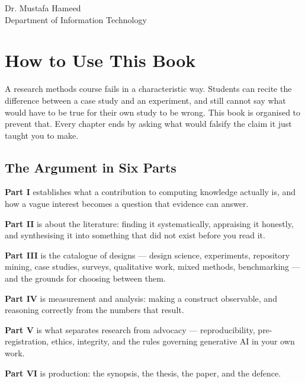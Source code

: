 \begin{center}
\vfill
{\small\color{neutral}Dr. Mustafa Hameed}\\[2pt]
{\footnotesize\color{neutral}Department of Information Technology}
\vspace{0.4cm}
\end{center}

\clearpage

\thispagestyle{plain}
\chapter*{How to Use This Book}

A research methods course fails in a characteristic way. Students can recite
the difference between a case study and an experiment, and still cannot say
what would have to be true for their own study to be wrong. This book is
organised to prevent that. Every chapter ends by asking what would falsify
the claim it just taught you to make.

\section*{The Argument in Six Parts}

\begin{tight}
  \item \textbf{Part I} establishes what a contribution to computing knowledge
    actually is, and how a vague interest becomes a question that evidence can
    answer.
  \item \textbf{Part II} is about the literature: finding it systematically,
    appraising it honestly, and synthesising it into something that did not
    exist before you read it.
  \item \textbf{Part III} is the catalogue of designs --- design science,
    experiments, repository mining, case studies, surveys, qualitative work,
    mixed methods, benchmarking --- and the grounds for choosing between them.
  \item \textbf{Part IV} is measurement and analysis: making a construct
    observable, and reasoning correctly from the numbers that result.
  \item \textbf{Part V} is what separates research from advocacy ---
    reproducibility, pre-registration, ethics, integrity, and the rules
    governing generative AI in your own work.
  \item \textbf{Part VI} is production: the synopsis, the thesis, the paper,
    and the defence.
\end{tight}

